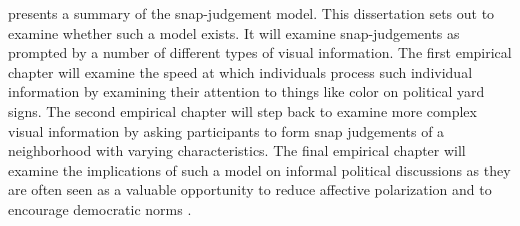\documentclass [12pt]{article}
\begin{document}
 presents a summary of the snap-judgement model. This dissertation sets out to examine whether such a model exists. It will examine snap-judgements as prompted by a number of different types of visual information. The first empirical chapter will examine the speed at which individuals process such individual information by examining their attention to things like color on political yard signs. The second empirical chapter will step back to examine more complex visual information by asking participants to form snap judgements of a neighborhood with varying characteristics. The final empirical chapter will examine the implications of such a model on informal political discussions as they are often seen as a valuable opportunity to reduce affective polarization and to encourage democratic norms \citep{levendusky_stecula_2021, santoro_broockman_2022_sa}. 
\end{document}
